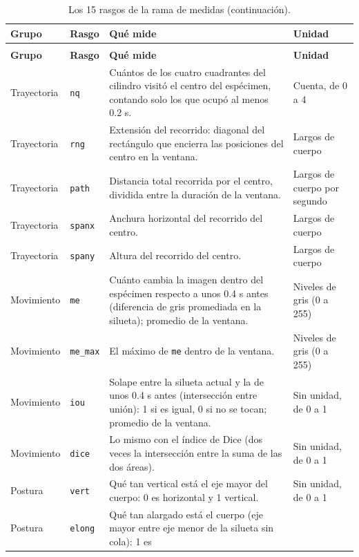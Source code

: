 \begin{longtable}{|p{1.7cm}|p{1.6cm}|p{6.6cm}|p{3.4cm}|}
\caption{Los 15 rasgos de la rama de medidas.}
\label{tab:rasgos_red}\\
\hline
\textbf{Grupo} & \textbf{Rasgo} & \textbf{Qué mide} & \textbf{Unidad} \\
\hline
\endfirsthead
\caption[]{Los 15 rasgos de la rama de medidas (continuación).}\\
\hline
\textbf{Grupo} & \textbf{Rasgo} & \textbf{Qué mide} & \textbf{Unidad} \\
\hline
\endhead
Trayectoria & \texttt{nq} & Cuántos de los cuatro cuadrantes del cilindro visitó el centro del espécimen, contando
solo los que ocupó al menos 0.2 s. & Cuenta, de 0 a 4 \\
\hline
Trayectoria & \texttt{rng} & Extensión del recorrido: diagonal del rectángulo que encierra las posiciones del centro
en la ventana. & Largos de cuerpo \\
\hline
Trayectoria & \texttt{path} & Distancia total recorrida por el centro, dividida entre la duración de la ventana. &
Largos de cuerpo por segundo \\
\hline
Trayectoria & \texttt{spanx} & Anchura horizontal del recorrido del centro. & Largos de cuerpo \\
\hline
Trayectoria & \texttt{spany} & Altura del recorrido del centro. & Largos de cuerpo \\
\hline
Movimiento & \texttt{me} & Cuánto cambia la imagen dentro del espécimen respecto a unos 0.4 s antes (diferencia de
gris promediada en la silueta); promedio de la ventana. & Niveles de gris (0 a 255) \\
\hline
Movimiento & \texttt{me\_max} & El máximo de \texttt{me} dentro de la ventana. & Niveles de gris (0 a 255) \\
\hline
Movimiento & \texttt{iou} & Solape entre la silueta actual y la de unos 0.4 s antes (intersección entre unión): 1 si
es igual, 0 si no se tocan; promedio de la ventana. & Sin unidad, de 0 a 1 \\
\hline
Movimiento & \texttt{dice} & Lo mismo con el índice de Dice (dos veces la intersección entre la suma de las dos
áreas). & Sin unidad, de 0 a 1 \\
\hline
Postura & \texttt{vert} & Qué tan vertical está el eje mayor del cuerpo: 0 es horizontal y 1 vertical. & Sin
unidad, de 0 a 1 \\
\hline
Postura & \texttt{elong} & Qué tan alargado está el cuerpo (eje mayor entre eje menor de la silueta sin cola): 1 es

\end{longtable}
